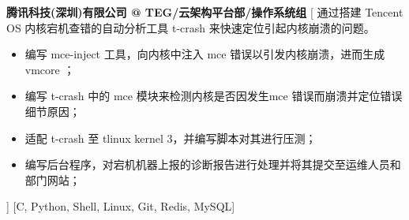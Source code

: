 \begin{experiences}
	{\textbf{腾讯科技(深圳)有限公司 @ TEG/云架构平台部/操作系统组}}%
	[
	通过搭建 Tencent OS 内核宕机查错的自动分析工具 t-crash 来快速定位引起内核崩溃的问题。
	\begin{itemize}
		\item {编写 mce-inject 工具，向内核中注入 mce 错误以引发内核崩溃，进而生成 vmcore ；}
		\item {编写 t-crash 中的 mce 模块来检测内核是否因发生mce 错误而崩溃并定位错误细节原因；}
		\item {适配 t-crash 至 tlinux kernel 3，并编写脚本对其进行压测；}
		\item {编写后台程序，对宕机机器上报的诊断报告进行处理并将其提交至运维人员和部门网站；}
	\end{itemize}
	]
	[C, Python, Shell, Linux, Git, Redis, MySQL]
	
\end{experiences}